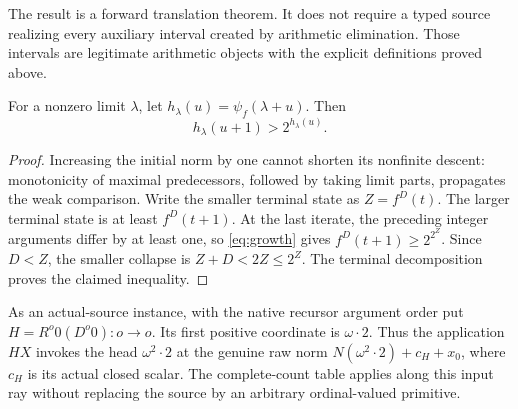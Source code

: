 The result is a forward translation theorem. It does not require a typed
source realizing every auxiliary interval created by arithmetic
elimination. Those intervals are legitimate arithmetic objects with the
explicit definitions proved above.

\begin{lemma}\label{lem:tail-growth}
For a nonzero limit \(\lambda\), let
\(h_\lambda(u)=\psi_f(\lambda+u)\). Then
\[
 h_\lambda(u+1)>2^{h_\lambda(u)}.
\]
\end{lemma}
\begin{proof}
Increasing the initial norm by one cannot shorten its nonfinite descent:
monotonicity of maximal predecessors, followed by taking limit parts,
propagates the weak comparison. Write the smaller terminal state as
\(Z=f^D(t)\). The larger terminal state is at least \(f^D(t+1)\).
At the last iterate, the preceding integer arguments differ by at least
one, so \eqref{eq:growth} gives \(f^D(t+1)\ge2^{2^Z}\).
Since \(D<Z\), the smaller collapse is \(Z+D<2Z\le2^Z\).
The terminal decomposition proves the claimed inequality.
\end{proof}

As an actual-source instance, with the native recursor argument order put
\(H=R^o0(D^o0):o\to o\). Its first positive coordinate is
\(\omega\cdot2\). Thus the application \(HX\) invokes the head
\(\omega^2\cdot2\) at the genuine raw norm
\(N(\omega^2\cdot2)+c_H+x_0\), where \(c_H\) is its actual closed
scalar. The complete-count table applies along this input ray without
replacing the source by an arbitrary ordinal-valued primitive.
